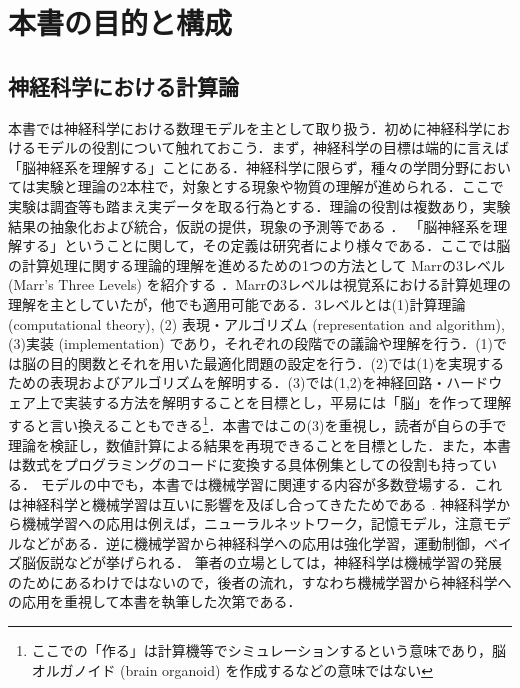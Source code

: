 \section{本書の目的と構成}
\subsection{神経科学における計算論}
本書では神経科学における数理モデルを主として取り扱う．初めに神経科学におけるモデルの役割について触れておこう．まず，神経科学の目標は端的に言えば「脳神経系を理解する」ことにある．神経科学に限らず，種々の学問分野においては実験と理論の2本柱で，対象とする現象や物質の理解が進められる．ここで実験は調査等も踏まえ実データを取る行為とする．理論の役割は複数あり，実験結果の抽象化および統合，仮説の提供，現象の予測等である \citep{Blohm2020-vc}．
「脳神経系を理解する」ということに関して，その定義は研究者により様々である．ここでは脳の計算処理に関する理論的理解を進めるための1つの方法として Marrの3レベル (Marr's Three Levels) を紹介する \citep{Marr1982-wk}．Marrの3レベルは視覚系における計算処理の理解を主としていたが，他でも適用可能である．3レベルとは(1)計算理論 (computational theory), (2) 表現・アルゴリズム (representation and algorithm), (3)実装 (implementation) であり，それぞれの段階での議論や理解を行う．(1)では脳の目的関数とそれを用いた最適化問題の設定を行う．(2)では(1)を実現するための表現およびアルゴリズムを解明する．(3)では(1,2)を神経回路・ハードウェア上で実装する方法を解明することを目標とし，平易には「脳」を作って理解すると言い換えることもできる\footnote{ここでの「作る」は計算機等でシミュレーションするという意味であり，脳オルガノイド (brain organoid) を作成するなどの意味ではない}．本書ではこの(3)を重視し，読者が自らの手で理論を検証し，数値計算による結果を再現できることを目標とした．また，本書は数式をプログラミングのコードに変換する具体例集としての役割も持っている．
モデルの中でも，本書では機械学習に関連する内容が多数登場する．これは神経科学と機械学習は互いに影響を及ぼし合ってきたためである \citep{Hassabis2017-zm}. 
神経科学から機械学習への応用は例えば，ニューラルネットワーク，記憶モデル，注意モデルなどがある．逆に機械学習から神経科学への応用は強化学習，運動制御，ベイズ脳仮説などが挙げられる．
筆者の立場としては，神経科学は機械学習の発展のためにあるわけではないので，後者の流れ，すなわち機械学習から神経科学への応用を重視して本書を執筆した次第である．
